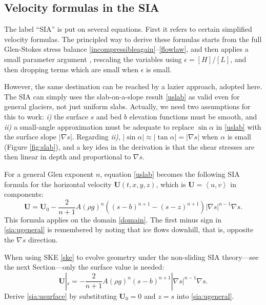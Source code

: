 \documentclass[letterpaper,final,12pt,reqno]{amsart}
\newcommand{\bU}{\mathbf{U}}
\newcommand{\eps}{\epsilon}
\newcommand{\grad}{\nabla}
\begin{document}
\subsection*{Velocity formulas in the SIA}  The label ``SIA'' is put on several equations.  First it refers to certain simplified velocity formulas.  The principled way to derive these formulas starts from the full Glen-Stokes stress balance \eqref{incompressibleagain}--\eqref{flowlaw}, and then applies a small parameter argument \cite[for example]{Fowler1997}, rescaling the variables using $\eps = [H]/[L]$, and then dropping terms which are small when $\eps$ is small.

However, the same destination can be reached by a lazier approach, adopted here.  The SIA can simply uses the slab-on-a-slope result \eqref{uslab} as valid even for general glaciers, not just uniform slabs.  Actually, we need two assumptions for this to work: \emph{i)} the surface $s$ and bed $b$ elevation functions must be smooth, and \emph{ii)} a small-angle approximation must be adequate to replace $\sin\alpha$ in \eqref{uslab} with the surface slope $|\grad s|$.  Regarding \emph{ii)}, $|\sin \alpha| \approx |\tan\alpha| = |\grad s|$ when $\alpha$ is small (Figure \ref{fig:slab}), and a key idea in the derivation is that the shear stresses are then linear in depth and proportional to $\grad s$.

For a general Glen exponent $n$, equation \eqref{uslab} becomes the following SIA formula for the horizontal velocity $\bU(t,x,y,z)$, which is $\bU=\left<u,v\right>$ in components:
\begin{equation}
\bU = \bU_0 - \frac{2}{n+1} A (\rho g)^n \left((s-b)^{n+1} - (s-z)^{n+1}\right) |\grad s|^{n-1} \grad s. \label{sia:ugeneral}
\end{equation}
This formula applies on the domain \eqref{domain}.  The first minus sign in \eqref{sia:ugeneral} is remembered by noting that ice flows downhill, that is, opposite the $\grad s$ direction.

When using SKE \eqref{ske} to evolve geometry under the non-sliding SIA theory---see the next Section---only the surface value is needed:
\begin{equation}
\bU|_s = - \frac{2}{n+1} A (\rho g)^n (s-b)^{n+1} |\grad s|^{n-1} \grad s. \label{sia:usurface}
\end{equation}
Derive \eqref{sia:usurface} by substituting $\bU_0=0$ and $z=s$ into \eqref{sia:ugeneral}.
\end{document}
